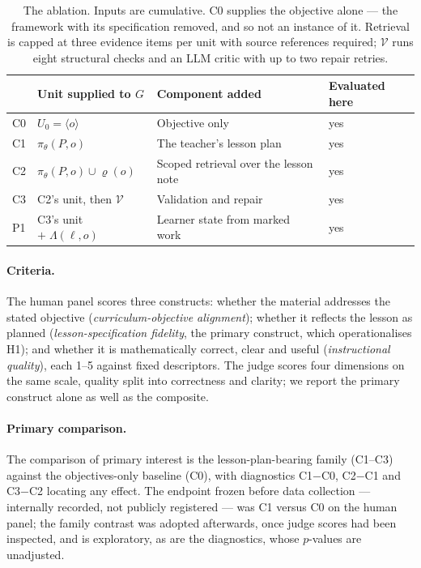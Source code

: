 \documentclass{article}
\begin{document}
\begin{table}[!htbp]
\centering
\small
\caption{The ablation. Inputs are cumulative. C0 supplies the objective alone --- the
framework with its specification removed, and so not an instance of it. Retrieval is capped at
three evidence items per unit with source references required; $\mathcal{V}$ runs eight
structural checks and an LLM critic with up to two repair retries.}
\label{tab:conditions}
\begin{tabular}{llll}
\toprule
& Unit supplied to $G$ & Component added & Evaluated here \\
\midrule
C0 & $U_0=\langle o\rangle$ & Objective only & yes \\
C1 & $\pi_\theta(P,o)$ & The teacher's lesson plan & yes \\
C2 & $\pi_\theta(P,o)\cup\varrho(o)$ & Scoped retrieval over the lesson note & yes \\
C3 & C2's unit, then $\mathcal{V}$ & Validation and repair & yes \\
P1 & C3's unit $+\;\Lambda(\ell,o)$ & Learner state from marked work & yes \\
\bottomrule
\end{tabular}
\end{table}

\paragraph{Criteria.}
The human panel scores three constructs: whether the material addresses the stated objective
(\emph{curriculum-objective alignment}); whether it reflects the lesson as planned
(\emph{lesson-specification fidelity}, the primary construct, which operationalises H1); and
whether it is mathematically correct, clear and useful (\emph{instructional quality}), each
1--5 against fixed descriptors. The judge scores four dimensions on the
same scale, quality split into correctness and clarity; we report the primary construct alone
as well as the composite.

\paragraph{Primary comparison.}
The comparison of primary interest is the lesson-plan-bearing family (C1--C3) against the
objectives-only baseline (C0), with diagnostics C1$-$C0, C2$-$C1 and C3$-$C2 locating any
effect. The endpoint frozen
before data collection --- internally recorded, not publicly registered --- was C1 versus C0 on
the human panel; the family contrast was adopted afterwards, once judge scores had been
inspected, and is exploratory, as are the diagnostics, whose $p$-values are unadjusted.
\end{document}
